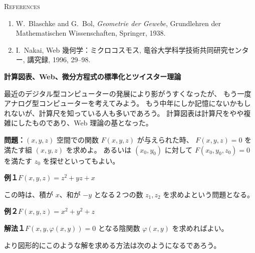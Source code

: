 \documentclass[uplatex,dvipdfmx]{jlreq}
\begin{document}
\bigskip

\begin{center}
  \textsc{References}
\end{center}

\begin{enumerate}
  \item W.~Blaschke and G.~Bol,
        \textit{Geometrie der Gewebe},
        Grundlehren der Mathematischen Wissenschaften,
        Springer, 1938.
  \item I.~Nakai,
        Web 幾何学：ミクロコスモス,
        竜谷大学科学技術共同研究センター, 講究録, 1996, 29--98.
\end{enumerate}

\newpage

\noindent
{\large\bfseries 計算図表、Web、微分方程式の標準化とツイスター理論}

\medskip
\hspace*{\fill}{\large\bfseries 佐藤 肇（名古屋大学・多元数理）}

\bigskip\bigskip

最近のデジタル型コンピューターの発展により影がうすくなったが、
もう一度アナログ型コンピューターを考えてみよう。
もう中年にしか記憶にないかもしれないが、計算尺を知っている人も多いであろう。
計算図表は計算尺をやや複雑にしたものであり、Web 理論の基となった。

\bigskip

\noindent\textbf{問題：}$(x,y,z)$ 空間での関数 $F(x,y,z)$ が与えられた時、
$F(x,y,z) = 0$ を満たす組 $(x,y,z)$ を求めよ。
あるいは $(x_0, y_0)$ に対して $F(x_0, y_0, z_0) = 0$ を満たす $z_0$ を探せといってもよい。

\bigskip

\noindent\textbf{例１}\quad $F(x,y,z) = z^2 + yz + x$

この時は、積が $x$、和が $-y$ となる２つの数 $z_1, z_2$ を求めよという問題となる。

\medskip

\noindent\textbf{例２}\quad $F(x,y,z) = x^2 + y^2 + z$

\bigskip

\noindent\textbf{解法１}\quad $F(x,y,\varphi(x,y)) = 0$ となる陰関数 $\varphi(x,y)$ を求めればよい。

\medskip

より図形的にこのような解を求める方法は次のようになるであろう。
\end{document}
